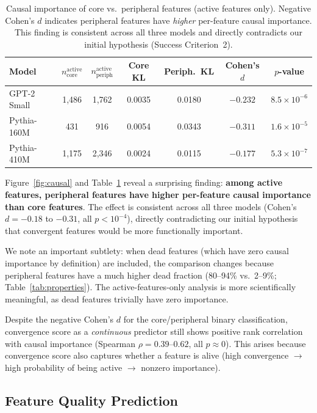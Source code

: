 \documentclass[final]{article}
\newcommand{\core}{\text{core}}
\newcommand{\periph}{\text{periph}}
\begin{document}
\begin{table}[t]
\caption{Causal importance of core vs.\ peripheral features (active features only). Negative Cohen's $d$ indicates peripheral features have \emph{higher} per-feature causal importance. This finding is consistent across all three models and directly contradicts our initial hypothesis (Success Criterion~2).}
\label{tab:causal}
\centering
\begin{tabular}{lcccccc}
\toprule
Model & $n_{\core}^{\text{active}}$ & $n_{\periph}^{\text{active}}$ & Core KL & Periph.\ KL & Cohen's $d$ & $p$-value \\
\midrule
GPT-2 Small & 1{,}486 & 1{,}762 & 0.0035 & 0.0180 & $-0.232$ & $8.5\!\times\!10^{-6}$ \\
Pythia-160M & 431 & 916 & 0.0054 & 0.0343 & $-0.311$ & $1.6\!\times\!10^{-5}$ \\
Pythia-410M & 1{,}175 & 2{,}346 & 0.0024 & 0.0115 & $-0.177$ & $5.3\!\times\!10^{-7}$ \\
\bottomrule
\end{tabular}
\end{table}

Figure~\ref{fig:causal} and Table~\ref{tab:causal} reveal a surprising finding: \textbf{among active features, peripheral features have higher per-feature causal importance than core features}. The effect is consistent across all three models (Cohen's $d = -0.18$ to $-0.31$, all $p < 10^{-4}$), directly contradicting our initial hypothesis that convergent features would be more functionally important.

We note an important subtlety: when dead features (which have zero causal importance by definition) are included, the comparison changes because peripheral features have a much higher dead fraction (80--94\% vs.\ 2--9\%; Table~\ref{tab:properties}). The active-features-only analysis is more scientifically meaningful, as dead features trivially have zero importance.

Despite the negative Cohen's $d$ for the core/peripheral binary classification, convergence score as a \emph{continuous} predictor still shows positive rank correlation with causal importance (Spearman $\rho = 0.39$--$0.62$, all $p \approx 0$). This arises because convergence score also captures whether a feature is alive (high convergence $\rightarrow$ high probability of being active $\rightarrow$ nonzero importance).

\subsection{Feature Quality Prediction}
\end{document}
